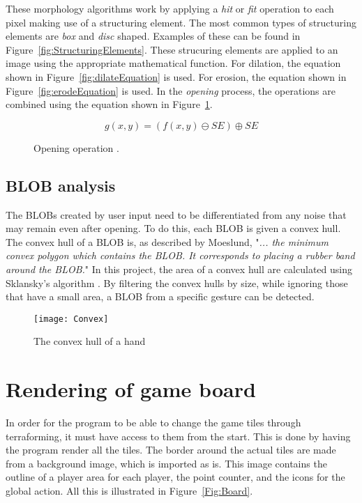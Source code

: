 These morphology algorithms work by applying a \textit{hit} or \textit{fit} operation to each pixel making use of a structuring element. The most common types of structuring elements are \textit{box} and \textit{disc} shaped. Examples of these can be found in Figure~\ref{fig:StructuringElements}. These strucuring elements are applied to an image using the appropriate mathematical function. For dilation, the equation shown in Figure~\ref{fig:dilateEquation} is used. For erosion, the equation shown in Figure~\ref{fig:erodeEquation} is used. In the \textit{opening} process, the operations are combined using the equation shown in Figure~\ref{fig:openingEquation}.

\begin{figure}[!h]
	\centering
	\begin{displaymath}
	g(x, y) = (f(x, y) \ominus SE) \oplus SE
	\end{displaymath}
	\caption{Opening operation \citep{moeslund_introduction_2012}. \label{fig:openingEquation}}
\end{figure}

\subsection{BLOB analysis}

The BLOBs created by user input need to be differentiated from any noise that may remain even after opening. To do this, each BLOB is given a convex hull. The convex hull of a BLOB is, as described by Moeslund, "\textit{... the minimum convex polygon which contains the BLOB. It corresponds to placing a rubber band around the BLOB.}" \citep{moeslund_introduction_2012} In this project, the area of a convex hull are calculated using Sklansky's algorithm \citep{Sklansky198279}. By filtering the convex hulls by size, while ignoring those that have a small area, a BLOB from a specific gesture can be detected.
\begin{figure}[h!]
\begin{center}
\texttt{[image: Convex]}
\end{center}
\caption{The convex hull of a hand \label{Fig:Convex}}
\end{figure}

\section{Rendering of game board}
In order for the program to be able to change the game tiles through terraforming, it must have access to them from the start. This is done by having the program render all the tiles. The border around the actual tiles are made from a background image, which is imported as is. This image contains the outline of a player area for each player, the point counter, and the icons for the global action. All this is illustrated in Figure~\ref{Fig:Board}.

